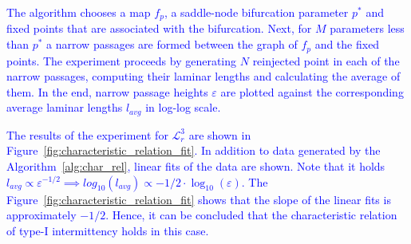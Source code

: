 \par
\textcolor{blue}{
The algorithm chooses a map $f_{p}$, a saddle-node bifurcation parameter $p^{*}$ and fixed points that are associated with the bifurcation.
Next, for $M$ parameters less than $p^{*}$ a narrow passages are formed between the graph of $f_{p}$ and the fixed points.
The experiment proceeds by generating $N$ reinjected point in each of the narrow passages, computing their laminar lengths and calculating the average of them.
In the end, narrow passage heights $\varepsilon$ are plotted against the corresponding average laminar lengths $l_{avg}$ in log-log scale.
}
\par
\textcolor{blue}{
The results of the experiment for $\mathcal{L}_{r}^{3}$ are shown in Figure~\ref{fig:characteristic_relation_fit}.
In addition to data generated by the Algorithm~\ref{alg:char_rel}, linear fits of the data are shown.
Note that it holds $l_{avg} \propto \varepsilon ^ {-1/2} \implies log_{10}(l_{avg}) \propto -1/2 \cdot \log_{10}(\varepsilon)$.
The Figure~\ref{fig:characteristic_relation_fit} shows that the slope of the linear fits is approximately $-1/2$.
Hence, it can be concluded that the characteristic relation of type-I intermittency holds in this case.
}
